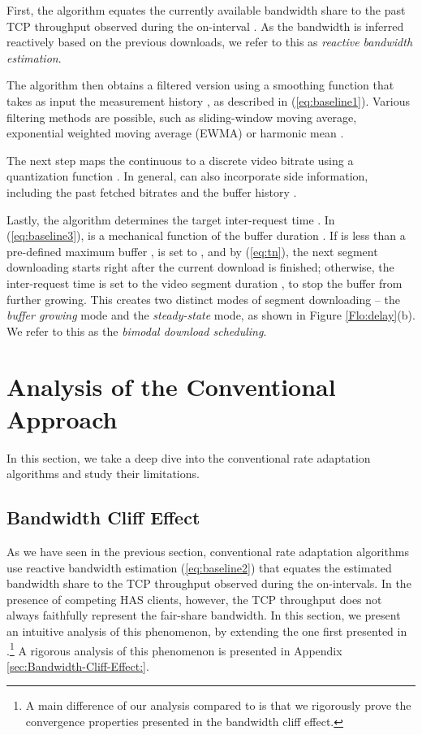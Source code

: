 \documentclass[conference]{IEEEtran}
\theoremstyle{plain}
\theoremstyle{definition}
\theoremstyle{plain}
\theoremstyle{plain}
\begin{document}
First, the algorithm equates the currently available bandwidth share
 to the past TCP throughput  observed
during the on-interval . As the bandwidth is inferred
reactively based on the previous downloads, we refer to this as \emph{reactive
bandwidth estimation}.

The algorithm then obtains a filtered version  using
a smoothing function  that takes as input the measurement
history , as described in (\ref{eq:baseline1}).
Various filtering methods are possible, such as sliding-window moving
average, exponential weighted moving average (EWMA) or harmonic mean
\cite{Jiang:CoNext12}.

The next step maps the continuous  to a discrete
video bitrate  using a quantization function
. In general,  can also incorporate side information,
including the past fetched bitrates  and the buffer
history . 

Lastly, the algorithm determines the target inter-request time .
In (\ref{eq:baseline3}),  is a mechanical function of
the buffer duration . If  is less than a pre-defined
maximum buffer ,  is set to , and by (\ref{eq:tn}),
the next segment downloading starts right after the current download
is finished; otherwise, the inter-request time is set to the video
segment duration , to stop the buffer from further growing.
This creates two distinct modes of segment downloading -- the \emph{buffer
growing} mode and the \emph{steady-state} mode, as shown in Figure
\ref{Flo:delay}(b). We refer to this as the \emph{bimodal download
scheduling}. 


\section{Analysis of the Conventional Approach\label{sec:Analysis-of-Rule-of-Thumb}}

In this section, we take a deep dive into the conventional rate adaptation
algorithms and study their limitations.


\subsection{Bandwidth Cliff Effect\label{sub:Bandwidth-Overestimation}}

As we have seen in the previous section, conventional rate adaptation
algorithms use reactive bandwidth estimation (\ref{eq:baseline2})
that equates the estimated bandwidth share to the TCP throughput observed
during the on-intervals. In the presence of competing HAS clients,
however, the TCP throughput does not always faithfully represent the
fair-share bandwidth. In this section, we present an intuitive analysis
of this phenomenon, by extending the one first presented in \cite{Akhshabi:NOSSDAV12}.\footnote{A main difference of our analysis compared to \cite{Akhshabi:NOSSDAV12}
is that we rigorously prove the convergence properties presented in
the bandwidth cliff effect.} A rigorous analysis of this phenomenon is presented in Appendix \ref{sec:Bandwidth-Cliff-Effect:}.
\end{document}
